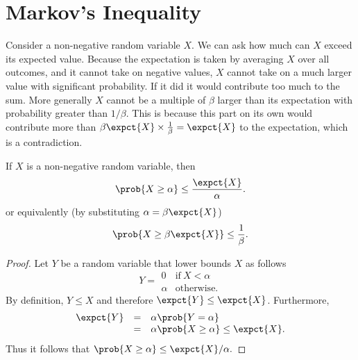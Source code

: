 \section{Markov's Inequality}
\label{sec:probability::expectation::markov}

\begin{cluster}
\label{grp:grm:probability::expectation::consider}

\begin{gram}
\label{grm:probability::expectation::consider}
Consider a non-negative random variable $X$.  We can ask how much can
$X$ exceed its expected value.  Because the expectation is taken by
averaging $X$ over all outcomes, and it cannot take on negative
values, $X$ cannot take on a much larger value with significant
probability.  If it did it would contribute too much to the sum.
More generally $X$ cannot be a multiple of $\beta$ larger than its
expectation with probability greater than $1/\beta$.  This is because
this part on its own would contribute more than $\beta \expct{X}
\times \frac{1}{\beta} = \expct{X}$ to the expectation, which is a
contradiction.  

\end{gram}
\end{cluster}

\begin{flex}
\label{grp:thm:probability::expectation::markov-inequality}

\begin{theorem}
\label{thm:probability::expectation::markov-inequality}
If $X$ is a non-negative random variable,
then
\[ 
\prob{X \geq \alpha} \leq \frac{\expct{X}}{\alpha}. 
\]
or equivalently (by substituting $\alpha = \beta\expct{X}$)
\[ 
\prob{X \geq \beta\expct{X}} \leq \frac{1}{\beta}.
\]

\end{theorem}

\begin{proof}
\label{prf:probability::expectation::random}
Let $Y$ be a random variable that lower bounds $X$ as follows
\[
Y = 
\begin{array}{ll}
0 & \text{if}~X < \alpha
\\
\alpha & \text{otherwise}.
\end{array} 
\]
By definition, $Y \le X$ and therefore $\expct{Y} \le \expct{X}$.
Furthermore, 
\[
\begin{array}{lcl}
\expct{Y} & = & \alpha \prob{Y = \alpha} \\
          & = & \alpha \prob{X \ge \alpha} \le \expct{X}. 
\end{array}
\]
Thus it follows that $\prob{X \ge \alpha} \le \expct{X} /  \alpha.$ 

\end{proof}
\end{flex}


